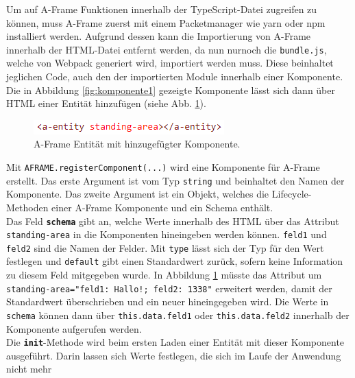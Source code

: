 \documentclass[a4paper,12pt,oneside]{article}
\begin{document}
        Um auf A-Frame Funktionen innerhalb der TypeScript-Datei zugreifen
        zu können, muss A-Frame zuerst mit einem Packetmanager wie yarn
        oder npm installiert werden. Aufgrund dessen kann die Importierung
        von A-Frame innerhalb der HTML-Datei entfernt werden, da nun
        nurnoch die \texttt{bundle.js}, welche von Webpack generiert wird,
        importiert werden muss. Diese beinhaltet jeglichen Code, auch den
        der importierten Module innerhalb einer Komponente. \\
        Die in Abbildung \ref{fig:komponente1} gezeigte Komponente lässt
        sich dann über HTML einer Entität hinzufügen 
        (siehe Abb. \ref{fig:komponente2}).
        \begin{figure}[h]
          \centering
          \includegraphics{img/coding/komponente2.png}
          \caption{A-Frame Entität mit hinzugefügter Komponente.}
          \label{fig:komponente2}
        \end{figure}
        Mit \texttt{AFRAME.registerComponent(...)} wird eine
        Komponente für A-Frame erstellt. 
        Das erste Argument ist vom Typ \texttt{string}
        und beinhaltet den Namen der Komponente. Das zweite Argument
        ist ein Objekt, welches die Lifecycle-Methoden einer A-Frame Komponente
        und ein Schema enthält. \\
        Das Feld \texttt{\textbf{schema}} gibt an, welche Werte
        innerhalb des HTML über das Attribut \texttt{standing-area} 
        in die Komponenten hineingeben werden können. \texttt{feld1}
        und \texttt{feld2} sind die Namen der Felder. Mit \texttt{type}
        lässt sich der Typ für den Wert festlegen und \texttt{default}
        gibt einen Standardwert zurück, sofern keine Information zu diesem
        Feld mitgegeben wurde. In Abbildung \ref{fig:komponente2} müsste
        das Attribut um \texttt{standing-area="feld1: Hallo!; feld2: 1338"}
        erweitert werden, damit der Standardwert überschrieben und ein
        neuer hineingegeben wird. Die Werte in \texttt{schema} können dann
        über \texttt{this.data.feld1} oder \texttt{this.data.feld2} 
        innerhalb der Komponente aufgerufen werden. \\
        Die \texttt{\textbf{init}}-Methode wird beim ersten Laden einer
        Entität mit dieser Komponente ausgeführt. Darin lassen sich
        Werte festlegen, die sich im Laufe der Anwendung nicht mehr 
\end{document}
